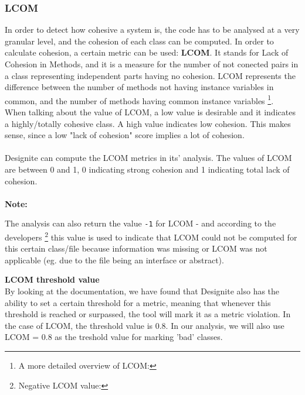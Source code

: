         \subsubsection{LCOM}
            In order to detect how cohesive a system is, the code has to be analysed at a very granular level, and the cohesion of each class can be computed. In order to calculate cohesion, a certain metric can be used: \textbf{LCOM}. It stands for Lack of Cohesion in Methods, and it is a measure for the number of not conected pairs in a class representing independent parts having no cohesion. LCOM represents the difference between the number of methods not having instance variables in common, and the number of methods having common instance variables
            \footnote{A more detailed overview of LCOM:
            }. \\
            When talking about the value of LCOM, a low value is desirable and it indicates a highly/totally cohesive class. A high value indicates low cohesion. This makes sense, since a low "lack of cohesion" score implies a lot of cohesion.\\\\
            Designite can compute the LCOM metrics in its' analysis. The values of LCOM are between 0 and 1, 0 indicating strong cohesion and 1 indicating total lack of cohesion. \\\\
            \textbf{Note:}
            \begin{adjustwidth}{1cm}{}
            The analysis can also return the value \texttt{-1} for LCOM - and according to the developers
            \footnote{Negative LCOM value: }
            this value is used to indicate that LCOM could not be computed for this certain class/file because information was missing or LCOM was not applicable (eg. due to the file being an interface or abstract).\\
            \end{adjustwidth}
            \textbf{LCOM threshold value}\\
            By looking at the documentation, we have found that Designite also has the ability to set a certain threshold for a metric, meaning that whenever this threshold is reached or surpassed, the tool will mark it as a metric violation. In the case of LCOM, the threshold value is 0.8. In our analysis, we will also use LCOM = 0.8 as the treshold value for marking 'bad' classes. 
            
